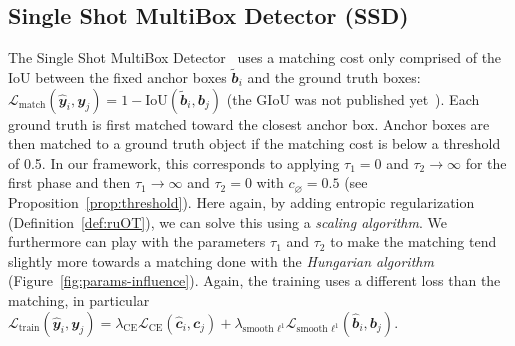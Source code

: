 \subsection{Single Shot MultiBox Detector (SSD)} The Single Shot MultiBox Detector~\cite{liu2016ssd} uses a matching cost only comprised of the $\mathrm{IoU}$ between the fixed anchor boxes $\tilde{\mathbfit{b}}_i$ and the ground truth boxes: $\mathcal{L}_{\text{match}}(\hat{\mathbfit{y}}_i, \mathbfit{y}_j) = 1-\mathrm{IoU}(\tilde{\mathbfit{b}}_i, \mathbfit{b}_j)$ (the $\mathrm{GIoU}$ was not published yet~\cite{giou}). Each ground truth is first matched toward the closest anchor box. Anchor boxes are then matched to a ground truth object if the matching cost is below a threshold of 0.5. In our framework, this corresponds to applying $\tau_1=0$ and $\tau_2\to \infty$ for the first phase and then $\tau_1\to \infty$ and $\tau_2=0$ with $c_{\varnothing} = 0.5$ (see Proposition~\ref{prop:threshold}). Here again, by adding entropic regularization (Definition~\ref{def:ruOT}), we can solve this using a \emph{scaling algorithm}. We furthermore can play with the parameters $\tau_1$ and $\tau_2$ to make the matching tend slightly more towards a matching done with the \emph{Hungarian algorithm} (Figure~\ref{fig:params-influence}). Again, the training uses a different loss than the matching, in particular $\mathcal{L}_{\text{train}}(\hat{\mathbfit{y}}_i, \mathbfit{y}_j) = \lambda_{\mathrm{CE}} \mathcal{L}_{\mathrm{CE}}(\hat{\mathbfit{c}}_i, \mathbfit{c}_j) + \lambda_{\text{smooth }\ell^1} \mathcal{L}_{\text{smooth }\ell^1}(\hat{\mathbfit{b}}_i, \mathbfit{b}_j)$.


